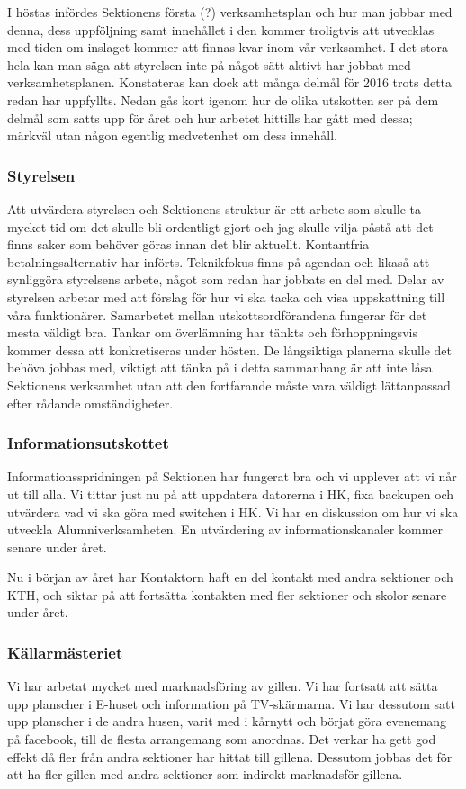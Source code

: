 \documentclass[../_main/handlingar.tex]{subfiles}
\begin{document}
I höstas infördes Sektionens första (?) verksamhetsplan och hur man jobbar med denna, dess uppföljning samt innehållet i den kommer troligtvis att utvecklas med tiden om inslaget kommer att finnas kvar inom vår verksamhet. I det stora hela kan man säga att styrelsen inte på något sätt aktivt har jobbat med verksamhetsplanen. Konstateras kan dock att många delmål för 2016 trots detta redan har uppfyllts. Nedan gås kort igenom hur de olika utskotten ser på dem delmål som satts upp för året och hur arbetet hittills har gått med dessa; märkväl utan någon egentlig medvetenhet om dess innehåll.

\subsubsection*{Styrelsen}
Att utvärdera styrelsen och Sektionens struktur är ett arbete som skulle ta mycket tid om det skulle bli ordentligt gjort och jag skulle vilja påstå att det finns saker som behöver göras innan det blir aktuellt. Kontantfria betalningsalternativ har införts. Teknikfokus finns på agendan och likaså att synliggöra styrelsens arbete, något som redan har jobbats en del med. Delar av styrelsen arbetar med att förslag för hur vi ska tacka och visa uppskattning till våra funktionärer. Samarbetet mellan utskottsordförandena fungerar för det mesta väldigt bra. Tankar om överlämning har tänkts och förhoppningsvis kommer dessa att konkretiseras under hösten. De långsiktiga planerna skulle det behöva jobbas med, viktigt att tänka på i detta sammanhang är att inte låsa Sektionens verksamhet utan att den fortfarande måste vara väldigt lättanpassad efter rådande omständigheter.

\subsubsection*{Informationsutskottet}
Informationsspridningen på Sektionen har fungerat bra och vi upplever att vi når ut till alla. Vi tittar just nu på att uppdatera datorerna i HK, fixa backupen och utvärdera vad vi ska göra med switchen i HK. Vi har en diskussion om hur vi ska utveckla Alumniverksamheten. En utvärdering av informationskanaler kommer senare under året.

Nu i början av året har Kontaktorn haft en del kontakt med andra sektioner och KTH, och siktar på att fortsätta kontakten med fler sektioner och skolor senare under året.

\subsubsection*{Källarmästeriet}
Vi har arbetat mycket med marknadsföring av gillen. Vi har fortsatt att sätta upp planscher i E-huset och information på TV-skärmarna. Vi har dessutom satt upp planscher i de andra husen, varit med i kårnytt och börjat göra evenemang på facebook, till de flesta arrangemang som anordnas. Det verkar ha gett god effekt då fler från andra sektioner har hittat till gillena. Dessutom jobbas det för att ha fler gillen med andra sektioner som indirekt marknadsför gillena.
\end{document}
